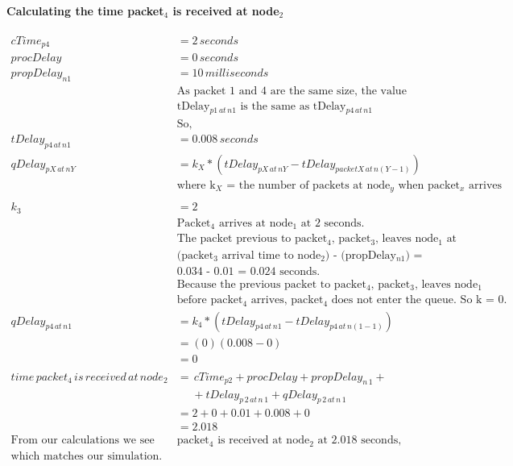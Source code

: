 \documentclass[fleqn,11pt]{article}
\begin{document}
\paragraph{Calculating the time packet$_4$ is received at node$_2$ }
\begin{align*}
cTime_{p4} &= 2\,seconds\\
procDelay &= 0\,seconds\\
propDelay_{n1} &= 10\,milliseconds\\
&\text{As packet 1 and 4 are the same size, the value for}\\
&\text{tDelay$_{p1\,at\,n1}$ is the same as tDelay$_{p4\,at\,n1}$}\\
&\text{So,}\\
tDelay_{p4\,at\,n1} &=  0.008 \,seconds\\
qDelay_{pX\,at\,nY} &= k_{X}*(tDelay_{pX\,at\,nY} - tDelay_{packetX\,at\,n(Y-1)}) \\
&\text{where k$_X$ = the number of packets at node$_y$ when packet$_x$ arrives}\\
\\
k_{3} &= 2\\
&\text{Packet$_ 4$ arrives at node$_1$ at 2 seconds.}\\
&\text{The packet previous to packet$_4$, packet$_3$, leaves node$_1$ at}\\
&\text{(packet$_3$ arrival time to node$_2$) - (propDelay$_{n1}$) =}\\
&\text{0.034 - 0.01 = 0.024 seconds. }\\
&\text{Because the previous packet to packet$_4$, packet$_3$, leaves node$_1$}\\
&\text{before packet$_4$ arrives, packet$_4$ does not enter the queue. So k = 0.} \\
qDelay_{p4\,at\,n1} &= k_{4}*(tDelay_{p4\,at\,n1} - tDelay_{p4\,at\,n(1-1)})\\
&= (0) (0.008 - 0) \\
&= 0 \\
\\
time\,packet_{4}\,is\,received\,at\,node_{2}  &= \,cTime_{p2} + procDelay + propDelay_{n\,1} +\\
&\,\,\,\,\,\,\,\, + tDelay_{p\,2\,at\,n\,1} + qDelay_{p\,2\,at\,n\,1} \\
&= 2 + 0 + 0.01 + 0.008 + 0 \\
&= 2.018\\
\text{From our calculations we see that }
&\text{packet$_4$ is received at node$_2$ at 2.018 seconds,} \\
\text{which matches our simulation.}
\end{align*}
\end{document}

